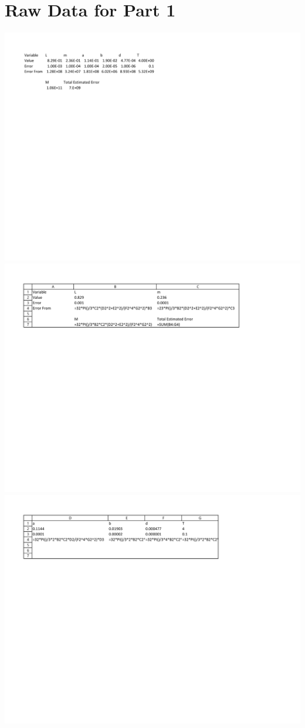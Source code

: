 \documentclass[leqno]{article}
\begin{document}
\section*{Raw Data for Part 1}
\includegraphics[width=\linewidth]{lab1dataa}
\includegraphics[width=\linewidth]{lab1dataaf1}
\includegraphics[width=\linewidth]{lab1dataaf2}
\newpage
\end{document}
